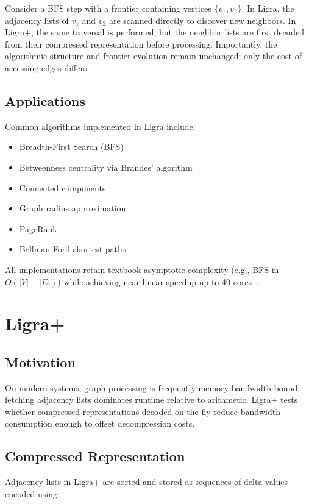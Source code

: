 \documentclass[a4paper,USenglish]{lipics-v2021}
\begin{document}
Consider a BFS step with a frontier containing vertices $\{v_1, v_2\}$. In Ligra, the adjacency lists of $v_1$ and $v_2$ are scanned directly to discover new neighbors. In Ligra+, the same traversal is performed, but the neighbor lists are first decoded from their compressed representation before processing. Importantly, the algorithmic structure and frontier evolution remain unchanged; only the cost of accessing edges differs.

\subsection{Applications}
Common algorithms implemented in Ligra include:

\begin{itemize}
    \item Breadth-First Search (BFS)
    \item Betweenness centrality via Brandes' algorithm
    \item Connected components
    \item Graph radius approximation
    \item PageRank
    \item Bellman-Ford shortest paths
\end{itemize}

All implementations retain textbook asymptotic complexity (e.g., BFS in $O(|V|+|E|)$) while achieving near-linear speedup up to 40 cores~\cite{shun2013ligra}.

\section{Ligra+}

\subsection{Motivation}
On modern systems, graph processing is frequently memory-bandwidth-bound: fetching adjacency lists dominates runtime relative to arithmetic. Ligra+ tests whether compressed representations decoded on the fly reduce bandwidth consumption enough to offset decompression costs.

\subsection{Compressed Representation}
Adjacency lists in Ligra+ are sorted and stored as sequences of delta values encoded using:
\end{document}
